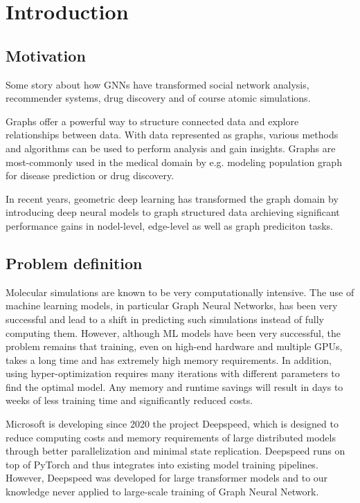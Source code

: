 \section{Introduction}

\subsection{Motivation}

Some story about how GNNs have transformed social network analysis, recommender systems, drug discovery and of course 
atomic simulations.

Graphs offer a powerful way to structure connected data and explore relationships between data. With data represented 
as graphs, various methods and algorithms can be used to perform analysis and gain insights. Graphs are most-commonly 
used in the medical domain by e.g. modeling population graph for disease prediction or drug discovery.

In recent years, geometric deep learning has transformed the graph domain by introducing deep neural models to graph 
structured data archieving significant performance gains in nodel-level, edge-level as well as graph prediciton tasks. 


\subsection{Problem definition}

Molecular simulations are known to be very computationally intensive. The use of machine learning models, in particular 
Graph Neural Networks, has been very successful and lead to a shift in predicting such simulations instead of 
fully computing them. However, although ML models have been very successful, the problem remains that training, 
even on high-end hardware and multiple GPUs, takes a long time and has extremely high memory requirements. In 
addition, using hyper-optimization requires many iterations with different parameters to find the optimal model. 
Any memory and runtime savings will result in days to weeks of less training time and significantly reduced costs.

Microsoft is developing since 2020 the project Deepspeed, which is designed to reduce computing costs and memory 
requirements of large distributed models through better parallelization and minimal state replication. Deepspeed 
runs on top of PyTorch and thus integrates into existing model training pipelines. However, Deepspeed was developed 
for large transformer models and to our knowledge never applied to large-scale training of Graph Neural Network.

